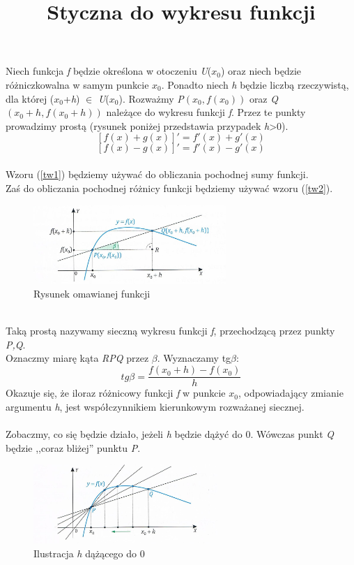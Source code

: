 \documentclass[12pt]{article}
\title{Styczna do wykresu funkcji}
\date{}
\begin{document}
\maketitle
\noindent
Niech funkcja \textit{f} będzie określona w otoczeniu \textit{U}($x_{0}$) oraz niech będzie różniczkowalna w samym punkcie $x_0$. Ponadto niech \textit{h} będzie liczbą rzeczywistą, dla której ($x_0$+\textit{h}) $\in$ \textit{U}($x_{0}$). Rozważmy \textit{P}$\left(x_0, f(x_0)\right)$ oraz \textit{Q}$\left(x_0+h, f(x_0+h)\right)$ należące do wykresu funkcji \textit{f}. Przez te punkty prowadzimy prostą (rysunek poniżej przedstawia przypadek \textit{h}>0).\\
\begin{equation}
\label{tw1}
[f(x)+g(x)]'= f'(x)+g'(x) 
\end{equation}
\begin{equation}
\label{tw2}
[f(x)-g(x)]'= f'(x)-g'(x) 
\end{equation}
\\
Wzoru (\ref{tw1}) będziemy używać do obliczania pochodnej sumy funkcji.\\
Zaś do obliczania pochodnej różnicy funkcji będziemy używać wzoru (\ref{tw2}).
\begin{figure}[ht]
\begin{center}
\includegraphics[height=3cm]{zdj1.jpg}
\caption{Rysunek omawianej funkcji}
\label{rys_model}
\end{center}
\end{figure}\\
Taką prostą nazywamy sieczną wykresu funkcji \textit{f}, przechodzącą przez punkty \textit{P,Q}.\\
 Oznaczmy miarę kąta \textit{RPQ} przez $\beta$. Wyznaczamy tg$\beta$:\\ 
 \begin{equation}
 \label{twierdzenie}
 tg \beta = \frac{f(x_0+h)-f(x_0)}{h}
 \end{equation}
\newpage Okazuje się, że iloraz różnicowy funkcji \textit{f} w punkcie $x_0$, odpowiadający zmianie argumentu \textit{h}, jest współczynnikiem kierunkowym rozważanej siecznej.\\
\\
Zobaczmy, co się będzie działo, jeżeli \textit{h} będzie dążyć do 0. Wówczas punkt \textit{Q} będzie ,,coraz bliżej'' punktu \textit{P}. 
\begin{figure}[ht]
\begin{center}
\includegraphics[height=3cm]{zdj2.jpg}
\caption{Ilustracja \textit{h} dążącego do 0}
\label{rys2_model}
\end{center}
\end{figure}
\end{document}
